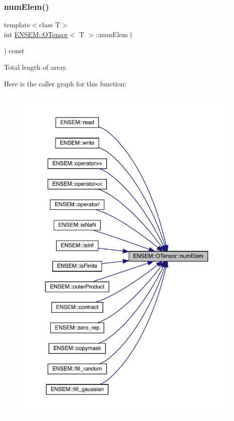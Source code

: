 \subsubsection{\texorpdfstring{numElem()}{numElem()}\hspace{0.1cm}{\footnotesize\ttfamily [2/3]}}
{\footnotesize\ttfamily template$<$class T$>$ \\
int \mbox{\hyperlink{classENSEM_1_1OTensor}{E\+N\+S\+E\+M\+::\+O\+Tensor}}$<$ T $>$\+::num\+Elem (\begin{DoxyParamCaption}{ }\end{DoxyParamCaption}) const\hspace{0.3cm}{\ttfamily [inline]}}



Total length of array. 

Here is the caller graph for this function\+:
\nopagebreak
\begin{figure}[H]
\begin{center}
\leavevmode
\includegraphics[width=350pt]{da/d8a/classENSEM_1_1OTensor_a30a241a5b4f16fab55fd70ffee52828a_icgraph}
\end{center}
\end{figure}
\mbox{\label{classENSEM_1_1OTensor_a30a241a5b4f16fab55fd70ffee52828a}} 
